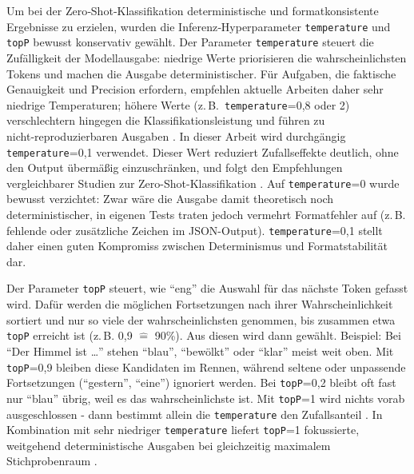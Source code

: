 Um bei der Zero‑Shot‑Klassifikation deterministische und formatkonsistente Ergebnisse zu erzielen, wurden die Inferenz‑Hyperparameter \texttt{temperature} und \texttt{topP} bewusst konservativ gewählt. Der Parameter \texttt{temperature} steuert die Zufälligkeit der Modellausgabe: niedrige Werte priorisieren die wahrscheinlichsten Tokens und machen die Ausgabe deterministischer. Für Aufgaben, die faktische Genauigkeit und Precision erfordern, empfehlen aktuelle Arbeiten daher sehr niedrige Temperaturen; höhere Werte (z.\,B.\ \texttt{temperature}=0{,}8 oder 2) verschlechtern hingegen die Klassifikationsleistung und führen zu nicht‑reproduzierbaren Ausgaben \cite{renze2024effect,mu2024navigating}. In dieser Arbeit wird durchgängig \texttt{temperature}=0{,}1 verwendet. Dieser Wert reduziert Zufallseffekte deutlich, ohne den Output übermäßig einzuschränken, und folgt den Empfehlungen vergleichbarer Studien zur Zero-Shot-Klassifikation \cite{mu2024navigating}. Auf \texttt{temperature}=0 wurde bewusst verzichtet: Zwar wäre die Ausgabe damit theoretisch noch deterministischer, in eigenen Tests traten jedoch vermehrt Formatfehler auf (z.\,B. fehlende oder zusätzliche Zeichen im JSON-Output). \texttt{temperature}=0{,}1 stellt daher einen guten Kompromiss zwischen Determinismus und Formatstabilität dar.

Der Parameter \texttt{topP} steuert, wie \enquote{eng} die Auswahl für das nächste Token gefasst wird. Dafür werden die möglichen Fortsetzungen nach ihrer Wahrscheinlichkeit sortiert und nur so viele der wahrscheinlichsten genommen, bis zusammen etwa \texttt{topP} erreicht ist (z.\,B. 0{,}9 $\widehat{=}$ 90\%). Aus diesen wird dann gewählt. Beispiel: Bei \enquote{Der Himmel ist \dots} stehen \enquote{blau}, \enquote{bewölkt} oder \enquote{klar} meist weit oben. Mit \texttt{topP}=0{,}9 bleiben diese Kandidaten im Rennen, während seltene oder unpassende Fortsetzungen (\enquote{gestern}, \enquote{eine}) ignoriert werden. Bei \texttt{topP}=0{,}2 bleibt oft fast nur \enquote{blau} übrig, weil es das wahrscheinlichste ist. Mit \texttt{topP}=1 wird nichts vorab ausgeschlossen - dann bestimmt allein die \texttt{temperature} den Zufallsanteil \cite{renze2024effect}. In Kombination mit sehr niedriger \texttt{temperature} liefert \texttt{topP}=1 fokussierte, weitgehend deterministische Ausgaben bei gleichzeitig maximalem Stichprobenraum \cite{mu2024navigating}.